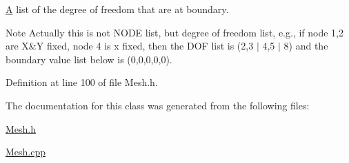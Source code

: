 \mbox{\hyperlink{class_a}{A}} list of the degree of freedom that are at boundary. 

\begin{DoxyNote}{Note}
Actually this is not N\+O\+DE list, but degree of freedom list, e.\+g., if node 1,2 are X\&Y fixed, node 4 is x fixed, then the D\+OF list is (2,3 $\vert$ 4,5 $\vert$ 8) and the boundary value list below is (0,0,0,0,0). 
\end{DoxyNote}


Definition at line 100 of file Mesh.\+h.



The documentation for this class was generated from the following files\+:\begin{DoxyCompactItemize}
\item 
\mbox{\hyperlink{_mesh_8h}{Mesh.\+h}}\item 
\mbox{\hyperlink{_mesh_8cpp}{Mesh.\+cpp}}\end{DoxyCompactItemize}
